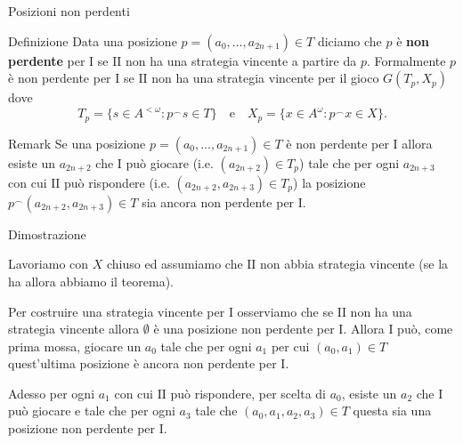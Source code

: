 \documentclass[aspectratio=43]{beamer}
\begin{document}
\begin{frame}{Posizioni non perdenti}
    \begin{block}{Definizione}
    Data una posizione \(p = (a_0, \ldots, a_{2n+1}) \in T\) diciamo che \(p\) è \textbf{non perdente} per \(\mathrm{I}\) se \(\mathrm{II}\) non ha una strategia vincente a partire da \(p\).
    Formalmente \(p\) è non perdente per \(\mathrm{I}\) se \(\mathrm{II}\) non ha una strategia vincente per il gioco \(G(T_p, X_p)\)     dove
    \begin{equation*}
      T_p = \{ s \in A^{<\omega} : p^\smallfrown s \in T\} \quad \text{e} \quad X_p = \{x \in A^\omega : p^\smallfrown x \in X\}.
    \end{equation*}
  \end{block}
  \pause
  \begin{block}{Remark}
    Se una posizione \(p = (a_0, \ldots, a_{2n+1}) \in T\) è non perdente per \(\mathrm{I}\) allora esiste un \(a_{2n + 2}\) che \(\mathrm{I}\) può giocare (i.e. \((a_{2n +2}) \in T_p\)) tale che per ogni \(a_{2n + 3}\) con cui \(\mathrm{II}\) può rispondere (i.e. \((a_{2n + 2}, a_{2n + 3}) \in T_p\)) la posizione \(p^\smallfrown (a_{2n + 2}, a_{2n + 3}) \in T\) sia ancora non perdente per \(\mathrm{I}\).
  \end{block}
\end{frame}

\begin{frame}{Dimostrazione}
  \begin{block}{}
    Lavoriamo con \(X\) chiuso ed assumiamo che \(\mathrm{II}\) non abbia strategia vincente (se la ha allora abbiamo il teorema).
  \end{block}
  \pause

  \begin{block}{}
    Per costruire una strategia vincente per \(\mathrm{I}\) osserviamo che se \(\mathrm{II}\) non ha una strategia vincente allora \(\emptyset\) è una posizione non perdente per \(\mathrm{I}\).
    Allora \(\mathrm{I}\) può, come prima mossa, giocare un \(a_0\) tale che per ogni \(a_1\) per cui \((a_0, a_1) \in T\) quest'ultima posizione è ancora non perdente per \(\mathrm{I}\).
  \end{block}
  \pause

  \begin{block}{}
    Adesso per ogni \(a_1\) con cui \(\mathrm{II}\) può rispondere, per scelta di \(a_0\), esiste un \(a_2\) che \(\mathrm{I}\) può giocare e tale che per ogni \(a_3\) tale che \((a_0, a_1, a_2, a_3) \in T\) questa sia una posizione non perdente per \(\mathrm{I}\).
  \end{block}
\end{frame}
\end{document}
